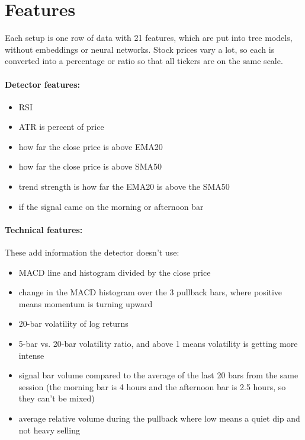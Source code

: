 \documentclass[11pt]{article}
\begin{document}
\section{Features}

Each setup is one row of data with 21 features, which are put into tree models, without embeddings or neural networks. Stock prices vary a lot, so each is converted into a percentage or ratio so that all tickers are on the same scale.
 
\paragraph{Detector features:}
\begin{itemize}
  \item RSI
  \item ATR is percent of price
  \item how far the close price is above EMA20
  \item how far the close price is above SMA50
  \item trend strength is how far the EMA20 is above the SMA50
  \item if the signal came on the morning or afternoon bar
\end{itemize}

\paragraph{Technical features:} These add information the detector doesn't use:
\begin{itemize}
  \item MACD line and histogram divided by the close price
  \item change in the MACD histogram over the 3 pullback bars, where positive means momentum is turning upward
  \item 20-bar volatility of log returns
  \item 5-bar vs. 20-bar volatility ratio, and above 1 means volatility is getting more intense
  \item signal bar volume compared to the average of the last 20 bars from the same session (the morning bar is 4 hours and the afternoon bar is 2.5 hours, so they can't be mixed)
  \item average relative volume during the pullback where low means a quiet dip and not heavy selling
\end{itemize}
 
\end{document}
